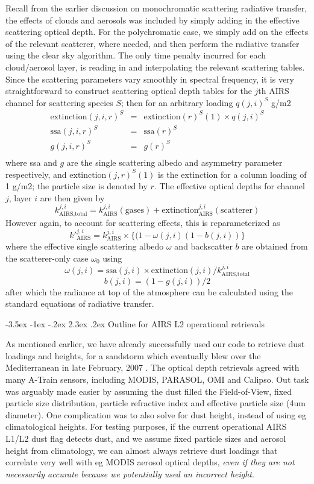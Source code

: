 \documentclass[11pt]{article}
\makeatletter
\renewcommand{\section}{\@startsection {section}{1}{\z@}%
                                   {-3.5ex \@plus -1ex \@minus -.2ex}%
                                   {2.3ex \@plus.2ex}%
                                   {\reset@font\large\bfseries}}
\makeatother
\begin{document}
Recall from the earlier discussion on monochromatic scattering
radiative transfer, the effects of clouds and aerosols was included by
simply adding in the effective scattering optical depth. For the
polychromatic case, we simply add on the effects of the relevant
scatterer, where needed, and then perform the radiative transfer using
the clear sky algorithm. The only time penalty incurred for each
cloud/aerosol layer, is reading in and interpolating the relevant
scattering tables. Since the scattering parameters vary smoothly in
spectral frequency, it is very straightforward to construct scattering
optical depth tables for the $j$th AIRS channel for scattering species
$S$; then for an arbitrary loading $q(j,i)^{S}$ g/m2
\begin{eqnarray*}
  \text{extinction}(j,i,r)^{S} & = &  \text{extinction}(r)^{S}(1) \times  q(j,i)^{S} \\
  \text{ssa}(j,i,r)^{S} & = &  \text{ssa}(r)^{S} \\
  g(j,i,r)^{S} & = &  g(r)^{S} \\
\end{eqnarray*}
where ssa and $g$ are the single scattering albedo and asymmetry
parameter respectively, and $\text{extinction}(j,r)^{S}(1)$ is the
extinction for a column loading of 1 g/m2; the particle size is
denoted by $r$. The effective optical depths for channel $j$, layer
$i$ are then given by
\[
k_{\text{AIRS,total}}^{j,i} = k_{\text{AIRS}}^{j,i}(\text{gases}) +
\text{extinction}_{\text{AIRS}}^{j,i}(\text{scatterer})
\]
However again, to account for scattering effects, this is
reparameterized as
\[
k\prime_{\text{AIRS}}^{j,i} = k_{\text{AIRS}}^{j,i} \times \{
(1-\omega(j,i) (1-b(j,i)) \}
\]
where the effective single scattering albedo $\omega$ and backscatter
$b$ are obtained from the scatterer-only case $\omega_{0}$ using
\[
\omega(j,i) = \text{ssa}(j,i) \times
\text{extinction}(j,i)/k_{\text{AIRS,total}}^{j,i}
\]
\[
b(j,i) = (1 - g(j,i))/2
\]
after which the radiance at top of the atmosphere can be calculated
using the standard equations of radiative transfer.

\section{Outline for AIRS L2 operational retrievals}

As mentioned earlier, we have already successfully used our code to
retrieve dust loadings and heights, for a sandstorm which eventually
blew over the Mediterranean in late February, 2007 \cite{mac:10}. The
optical depth retrievals agreed with many A-Train sensors, including
MODIS, PARASOL, OMI and Calipso. Out task was arguably made easier by
assuming the dust filled the Field-of-View, fixed particle size
distribution, particle refractive index and effective particle size
(4um diameter). One complication was to also solve for dust height,
instead of using eg climatological heights. For testing purposes, if
the current operational AIRS L1/L2 dust flag detects dust, and we
assume fixed particle sizes and aerosol height from climatology, we
can almost always retrieve dust loadings that correlate very well with
eg MODIS aerosol optical depths, {\em even if they are not necessarily
  accurate because we potentially used an incorrect height}.
\end{document}

